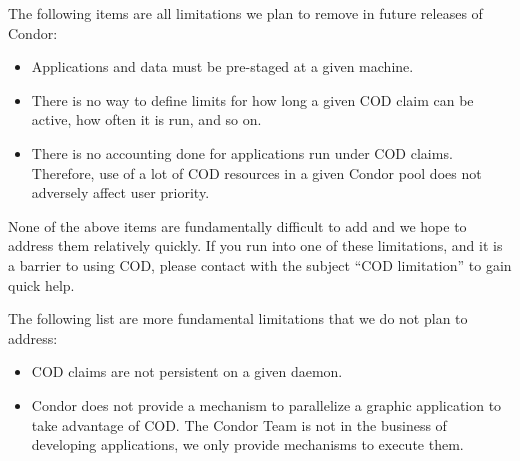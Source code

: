 The following items are all limitations we plan to remove in future
releases of Condor:

\begin{itemize}

\item Applications and data must be pre-staged at a given machine. 

\item There is no way to define limits for how long a given COD claim
  can be active, how often it is run, and so on.

\item There is no accounting done for applications run under COD
  claims.
  Therefore, use of a lot of COD resources in a given Condor pool
  does not adversely affect user priority.

\end{itemize}

None of the above items are fundamentally difficult to add and we hope
to address them relatively quickly.
If you run into one of these limitations, and it is a barrier to
using COD, please contact  with the
subject ``COD limitation'' to gain quick help.

The following list are more fundamental limitations that we do not
plan to address:

\begin{itemize}

\item COD claims are not persistent on a given  daemon.

\item Condor does not provide a mechanism to parallelize a graphic
  application to take advantage of COD.  
  The Condor Team is not in the business of developing applications,
  we only provide mechanisms to execute them.

\end{itemize}
